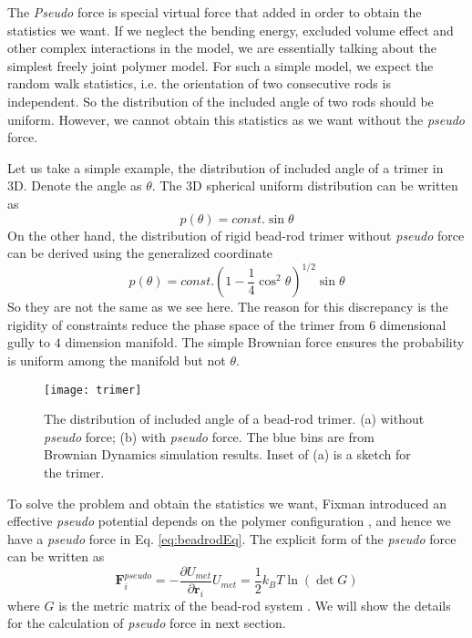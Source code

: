 The \emph{Pseudo} force is special virtual force that added in order to obtain the statistics we want. If we neglect the bending energy, excluded volume effect and other complex interactions in the model, we are essentially talking about the simplest freely joint polymer model. For such a simple model, we expect the random walk statistics, i.e. the orientation of two consecutive rods is independent. So the distribution of the included angle of two rods should be uniform. However, we cannot obtain this statistics as we want without the \emph{pseudo} force.

Let us take a simple example, the distribution of included angle of a trimer in 3D. Denote the angle as $\theta$. The 3D spherical uniform distribution can be written as
\begin{equation}
    \label{eq:trimerUniform}
    p(\theta) = const. \sin\theta
\end{equation}
On the other hand, the distribution of rigid bead-rod trimer without \emph{pseudo} force can be derived using the generalized coordinate
\begin{equation}
    \label{eq:trimerRigid}
    p(\theta) = const. (1-\frac{1}{4}\cos^2\theta)^{1/2}\sin\theta
\end{equation}
So they are not the same as we see here. The reason for this discrepancy is the rigidity of constraints reduce the phase space of the trimer from $6$ dimensional gully to $4$ dimension manifold. The simple Brownian force ensures the probability is uniform among the manifold but not $\theta$. 
\begin{figure}[htpb]
    \centering
    \texttt{[image: trimer]}
    \caption{The distribution of included angle of a bead-rod trimer. (a) without \emph{pseudo} force; (b) with \emph{pseudo} force. The blue bins are from Brownian Dynamics simulation results. Inset of (a) is a sketch for the trimer. }
    \label{fig:trimer}
\end{figure}

To solve the problem and obtain the statistics we want, Fixman introduced an effective \emph{pseudo} potential depends on the polymer configuration \cite{Fixman1974}, and hence we have a \emph{pseudo} force in Eq. \eqref{eq:beadrodEq}. The explicit form of the \emph{pseudo} force can be written as
\begin{subequations}
    \label{eq:pseudoForce}
    \begin{equation}
        \mathbf{F}_i^{pseudo} = -\frac{\partial U_{met}}{\partial\mathbf{r}_i}
    \end{equation}
    \begin{equation}
        U_{met} = \frac{1}{2}k_B T \ln(\det G)
    \end{equation}
\end{subequations}
where $G$ is the metric matrix of the bead-rod system \cite{Pasquali2002}. We will show the details for the calculation of \emph{pseudo} force in next section.

